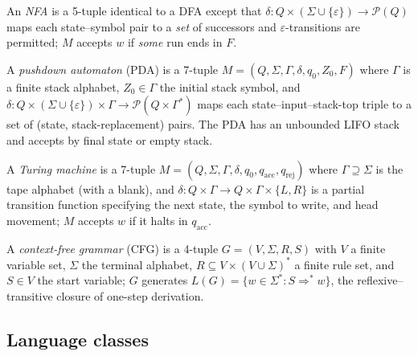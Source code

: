 \begin{defn}
\label{def:nfa}
An \emph{NFA} is a 5-tuple identical to a DFA except that $\delta : Q \times (\Sigma \cup \{\varepsilon\}) \to \mathcal{P}(Q)$ maps each state--symbol pair to a \emph{set} of successors and $\varepsilon$-transitions are permitted; $M$ accepts $w$ if \emph{some} run ends in $F$.
\end{defn}

\begin{defn}
\label{def:pda}
A \emph{pushdown automaton} (PDA) is a 7-tuple $M = (Q, \Sigma, \Gamma, \delta, q_0, Z_0, F)$ where $\Gamma$ is a finite stack alphabet, $Z_0 \in \Gamma$ the initial stack symbol, and $\delta : Q \times (\Sigma \cup \{\varepsilon\}) \times \Gamma \to \mathcal{P}(Q \times \Gamma^\ast)$ maps each state--input--stack-top triple to a set of (state, stack-replacement) pairs. The PDA has an unbounded LIFO stack and accepts by final state or empty stack.
\end{defn}

\begin{defn}
\label{def:tm}
A \emph{Turing machine} is a 7-tuple $M = (Q, \Sigma, \Gamma, \delta, q_0, q_{\mathrm{acc}}, q_{\mathrm{rej}})$ where $\Gamma \supseteq \Sigma$ is the tape alphabet (with a blank), and $\delta : Q \times \Gamma \to Q \times \Gamma \times \{L, R\}$ is a partial transition function specifying the next state, the symbol to write, and head movement; $M$ accepts $w$ if it halts in $q_{\mathrm{acc}}$.
\end{defn}

\begin{defn}
\label{def:cfg}
A \emph{context-free grammar} (CFG) is a 4-tuple $G = (V, \Sigma, R, S)$ with $V$ a finite variable set, $\Sigma$ the terminal alphabet, $R \subseteq V \times (V \cup \Sigma)^\ast$ a finite rule set, and $S \in V$ the start variable; $G$ generates $L(G) = \{w \in \Sigma^\ast : S \Rightarrow^\ast w\}$, the reflexive--transitive closure of one-step derivation.
\end{defn}

\subsection{Language classes}

